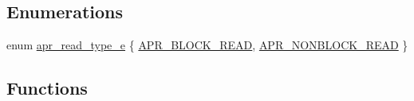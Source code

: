 \subsection*{Enumerations}
\begin{DoxyCompactItemize}
\item 
enum \hyperlink{group___a_p_r___util___bucket___brigades_ga756973fb6392bd1026c3d96b4519776d}{apr\-\_\-read\-\_\-type\-\_\-e} \{ \hyperlink{group___a_p_r___util___bucket___brigades_gga756973fb6392bd1026c3d96b4519776da2d983f5b7fd996434e0dded171c261d8}{A\-P\-R\-\_\-\-B\-L\-O\-C\-K\-\_\-\-R\-E\-A\-D}, 
\hyperlink{group___a_p_r___util___bucket___brigades_gga756973fb6392bd1026c3d96b4519776da42b97663ca71fbbf2e2af7c8192e5dd8}{A\-P\-R\-\_\-\-N\-O\-N\-B\-L\-O\-C\-K\-\_\-\-R\-E\-A\-D}
 \}
\end{DoxyCompactItemize}
\subsection*{Functions}
